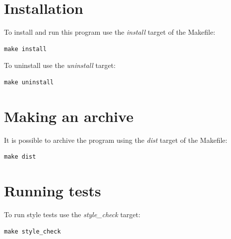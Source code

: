 \documentclass[a4paper, 12pt]{article}
\begin{document}
\begin{abstract}
{\parskip 10mm The deposit calculator counts accrued interest, tax amount and the deposit amount by the end of the term.}


\end{abstract}
\tableofcontents
\newpage

\section{Installation}
To install and run this program use the \textit{install} target of the Makefile:
\begin{verbatim}
make install
\end{verbatim}

To uninstall use the \textit{uninstall} target:
\begin{verbatim}
make uninstall
\end{verbatim}

\section{Making an archive}
It is possible to archive the program using the \textit{dist} target of the Makefile:
\begin{verbatim}
make dist
\end{verbatim}

\section{Running tests}
To run style tests use the \textit{style\_check} target:
\begin{verbatim}
make style_check
\end{verbatim}
\end{document}
